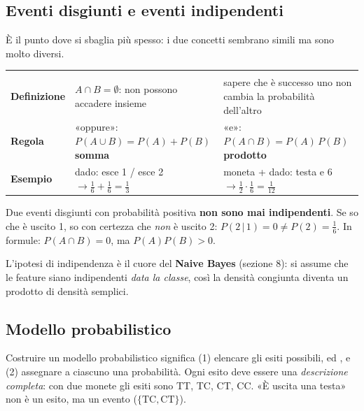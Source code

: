 
\subsection{Eventi disgiunti e eventi indipendenti}
È il punto dove si sbaglia più spesso: i due concetti sembrano simili ma sono molto diversi.

\begin{center}
\begin{tabularx}{\linewidth}{l Y Y}
 &  & \\
\textbf{Definizione} & $A\cap B=\emptyset$: non possono accadere insieme & sapere che è successo uno non cambia la probabilità dell'altro\\
\textbf{Regola} & «oppure»: $P(A\cup B)=P(A)+P(B)$ \;\textbf{somma} & «e»: $P(A\cap B)=P(A)\,P(B)$ \;\textbf{prodotto}\\
\textbf{Esempio} & dado: esce 1 / esce 2 $\to \frac16+\frac16=\frac13$ & moneta + dado: testa e 6 $\to \frac12\cdot\frac16=\frac1{12}$\\
\end{tabularx}
\end{center}

\begin{attenzione}
Due eventi disgiunti con probabilità positiva \textbf{non sono mai indipendenti}. Se so che è uscito 1, so con certezza che \emph{non} è uscito 2: $P(2\,|\,1)=0\neq P(2)=\tfrac16$. In formule: $P(A\cap B)=0$, ma $P(A)P(B)>0$.
\end{attenzione}

\begin{mlbox}
L'ipotesi di indipendenza è il cuore del \textbf{Naive Bayes} (sezione 8): si assume che le feature siano indipendenti \emph{data la classe}, così la densità congiunta diventa un prodotto di densità semplici.
\end{mlbox}

\subsection{Modello probabilistico}
Costruire un modello probabilistico significa (1) elencare gli esiti possibili,  ed , e (2) assegnare a ciascuno una probabilità. Ogni esito deve essere una \emph{descrizione completa}: con due monete gli esiti sono TT, TC, CT, CC. «È uscita una testa» non è un esito, ma un evento ($\{\mathrm{TC},\mathrm{CT}\}$).

